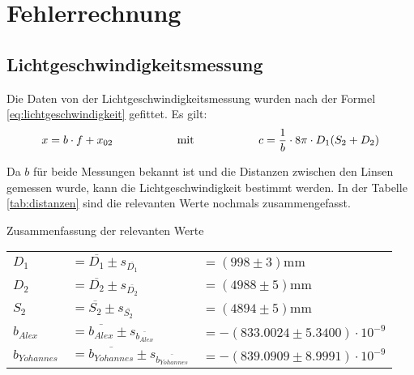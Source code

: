 \section{Fehlerrechnung}

\subsection{Lichtgeschwindigkeitsmessung}

Die  Daten  von  der   Lichtgeschwindigkeitsmessung   wurden   nach  der  Formel
\ref{eq:lichtgeschwindigkeit} gefittet. Es gilt:
\begin{equation}
    x = b \cdot f + x_{02} \hspace{20mm}\textrm{mit}\hspace{20mm} c = \frac{1}{b} \cdot 8\pi \cdot D_1(S_2+D_2)
\end{equation}

Da $b$ f\"ur beide Messungen bekannt ist und die Distanzen zwischen  den  Linsen
gemessen  wurde,  kann die Lichtgeschwindigkeit bestimmt werden. In der  Tabelle
\ref{tab:distanzen}   sind   die  relevanten  Werte  nochmals   zusammengefasst.

\begin{center}
    \begin{threeparttable}
        \caption{Zusammenfassung der relevanten Werte}
        \label{tab:distanzen}
        \begin{tabular}{llp{50mm}}
            \toprule
            $D_1$           & $= \overline{D_1} \pm s_{\overline{D_1}}$                     & $= (998 \pm 3)\textrm{mm}$ \\
            $D_2$           & $= \overline{D_2} \pm s_{\overline{D_2}}$                     & $= (4988 \pm 5)\textrm{mm}$ \\
            $S_2$           & $= \overline{S_2} \pm s_{\overline{S_2}}$                     & $= (4894 \pm 5)\textrm{mm}$ \\
            $b_{Alex}$      & $= \overline{b_{Alex}} \pm s_{\overline{b_{Alex}}}$           & $= -(833.0024 \pm 5.3400) \cdot 10^{-9}$ \\
            $b_{Yohannes}$  & $= \overline{b_{Yohannes}} \pm s_{\overline{b_{Yohannes}}}$   & $= -(839.0909 \pm 8.9991) \cdot 10^{-9}$ \\
            \bottomrule
        \end{tabular}
    \end{threeparttable}
\end{center}

